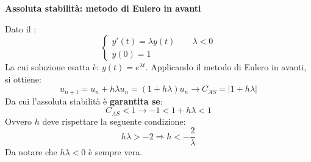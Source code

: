 \highspace
\begin{flushleft}\label{Assoluta stabilità: metodo di Eulero in avanti}
	\textcolor{Red2}{ \textbf{Assoluta stabilità: metodo di Eulero in avanti}}
\end{flushleft}
Dato il :
\begin{equation*}
	\begin{cases}
		y'\left(t\right) = \lambda y\left(t\right) \hspace{2em} \lambda < 0 \\
		y\left(0\right) = 1
	\end{cases}
\end{equation*}
La cui soluzione esatta è: $y\left(t\right) = e^{\lambda t}$. Applicando il metodo di Eulero in avanti, si ottiene:
\begin{equation*}
	u_{n+1} = u_{n} + h\lambda u_{n} = \left(1+h\lambda\right)u_{n} \longrightarrow C_{AS} = \left|1 + h\lambda\right|
\end{equation*}
Da cui l'assoluta stabilità è \textbf{garantita se}:
\begin{equation*}
	C_{AS} < 1 \longrightarrow -1 < 1 + h\lambda < 1
\end{equation*}
Ovvero $h$ deve rispettare la seguente condizione:
\begin{equation}
	h\lambda > -2 \Rightarrow h < -\dfrac{2}{\lambda}
\end{equation}
Da notare che $h\lambda < 0$ è sempre vera.

